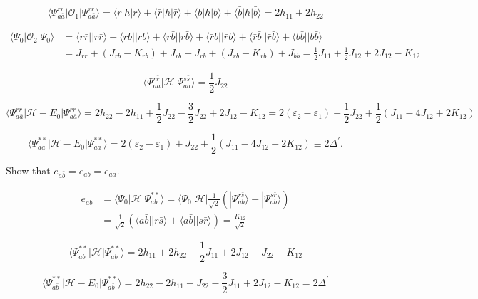 \documentclass[a4paper]{book}
\begin{document}
\begin{solution}
	\[
		\langle \Psi^{r \bar{r}}_{a \bar{a}} | \mathscr{O}_1 | \Psi^{r \bar{r}}_{a \bar{a}} \rangle = \langle r | h | r \rangle + \langle \bar{r} | h | \bar{r} \rangle + \langle b | h | b \rangle + \langle \bar{b} | h | \bar{b} \rangle = 2 h_{11} + 2h_{22}
	\]
	
	\begin{align*}
		\langle \Psi_0 | \mathscr{O}_2 | \Psi_0 \rangle &= \langle r \bar{r} || r \bar{r} \rangle + \langle rb || rb \rangle + \langle r \bar{b} || r \bar{b} \rangle + \langle \bar{r} b || \bar{r} b \rangle + \langle \bar{r} \bar{b} || \bar{r} \bar{b} \rangle + \langle b \bar{b} || b \bar{b} \rangle \\
		&= J_{rr} + \left( J_{rb} - K_{rb} \right) + J_{rb} + J_{rb} + \left( J_{rb} - K_{rb} \right) + J_{bb} = \frac{1}{2} J_{11} + \frac{1}{2} J_{12} + 2 J_{12} - K_{12}
	\end{align*}
	
	\[
		\langle \Psi^{r \bar{r}}_{a \bar{a}} | \mathscr{H} | \Psi^{s \bar{s}}_{a \bar{a}} \rangle = \frac{1}{2} J_{22}
	\]	
	
	\[
		\langle \Psi^{r \bar{r}}_{a \bar{a}} | \mathscr{H} - E_0 | \Psi^{r \bar{r}}_{a \bar{a}} \rangle = 2 h_{22} - 2 h_{11} + \frac{1}{2} J_{22} - \frac{3}{2} J_{22} + 2 J_{12} - K_{12} = 2( \varepsilon_2 - \varepsilon_1 ) + \frac{1}{2} J_{22} + \frac{1}{2} \left( J_{11} - 4J_{12} + 2K_{12} \right)
	\]
	
	\begin{equation}
		\langle \Psi^{**}_{a \bar{a}} | \mathscr{H} - E_0 | \Psi^{**}_{a \bar{a}} \rangle = 2( \varepsilon_2 - \varepsilon_1 ) + J_{22} + \frac{1}{2} \left( J_{11} - 4J_{12} + 2K_{12} \right) \equiv 2 \Delta^\prime.
	\end{equation}
		
	\end{solution}
	
	\begin{exercise}
	Show that $e_{a\bar{b}} = e_{\bar{a}b} = e_{a\bar{a}}$.
	\end{exercise}
	
	\begin{solution}
	
	\begin{align*}
		e_{a \bar{b}} &= \langle \Psi_0 | \mathscr{H} | \Psi^{**}_{ab} \rangle = \langle \Psi_0 | \mathscr{H} | \frac{1}{ \sqrt{2} } \left( |\Psi^{r\bar{s}}_{ab} \rangle + |\Psi^{s\bar{r}}_{ab} \rangle \right) \\
		&= \frac{1}{ \sqrt{2} } \left( \langle a \bar{b} || r \bar{s} \rangle + \langle a \bar{b} || s \bar{r} \rangle \right) = \frac{ K_{12} }{ \sqrt{2} }
	\end{align*}
	
	\[
		\langle \Psi^{**}_{a \bar{b}} | \mathscr{H} | \Psi^{**}_{a \bar{b}} \rangle = 2 h_{11} + 2 h_{22} + \frac{1}{2} J_{11} + 2 J_{12} + J_{22} - K_{12} 
	\]
	
	\[
		\langle \Psi^{**}_{a \bar{b}} | \mathscr{H} - E_0 | \Psi^{**}_{a \bar{b}} \rangle = 2 h_{22} - 2 h_{11} + J_{22} - \frac{3}{2} J_{11} + 2 J_{12} - K_{12} = 2 \Delta^\prime
	\]
	
	\end{solution}
	
\end{document}
